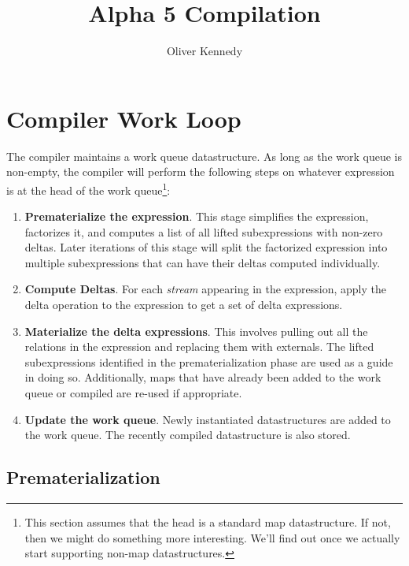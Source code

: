 \documentclass[11pt]{amsart}
\title{Alpha 5 Compilation}
\author{Oliver Kennedy}
\begin{document}
\maketitle

\section{Compiler Work Loop}

The compiler maintains a work queue datastructure.  As long as the work queue is non-empty, the compiler will perform the following steps on whatever expression is at the head of the work queue\footnote{This section assumes that the head is a standard map datastructure.  If not, then we might do something more interesting.  We'll find out once we actually start supporting non-map datastructures.}:

\begin{enumerate}
\item {\bf Prematerialize the expression}.  This stage simplifies the expression, factorizes it, and computes a list of all lifted subexpressions with non-zero deltas.  Later iterations of this stage will split the factorized expression into multiple subexpressions that can have their deltas computed individually.

\item {\bf Compute Deltas}.  For each {\em stream} appearing in the expression, apply the delta operation to the expression to get a set of delta expressions.

\item {\bf Materialize the delta expressions}.  This involves pulling out all the relations in the expression and replacing them with externals.  The lifted subexpressions identified in the prematerialization phase are used as a guide in doing so.  Additionally, maps that have already been added to the work queue or compiled are re-used if appropriate.

\item {\bf Update the work queue}.  Newly instantiated datastructures are added to the work queue.  The recently compiled datastructure is also stored.
\end{enumerate}

\subsection{Prematerialization}
\end{document}
